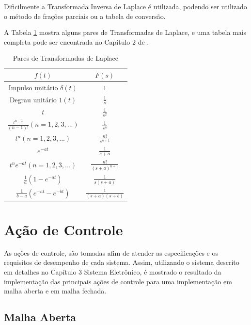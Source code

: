 Dificilmente a Transformada Inversa de Laplace é utilizada, podendo ser utilizado o método de frações parciais ou a tabela de conversão.

A Tabela \ref{tab:Laplace} mostra alguns pares de Transformadas de Laplace, e uma tabela mais completa pode ser encontrada no Capítulo 2 de \cite{Ogata}. 

\begin{table}[h]
\centering
\caption{Pares de Transformadas de Laplace}
\label{tab:Laplace}
\begin{tabular}{c|c}
\hline
$f(t)$ & $F(s)$ \\
\hline
\hline
Impulso unitário $\delta(t)$ 		& $1$ 			\\ \hline
Degrau unitário $1(t)$ 			& $\frac{1}{s}$		\\ \hline
$t$ 					& $\frac{1}{s^2}$ 	\\ \hline
$\frac{t^{n-1}}{(n-1)!} (n=1,2,3,...)$ 	& $\frac{1}{s^n}$ 	\\ \hline
$t^n (n=1,2,3,...)$ 			& $\frac{n!}{s^{n+1}}$ 	\\ \hline
$e^{-at}$ 				& $\frac{1}{s+a}$ 	\\ \hline
$t^n e^{-at} (n=1,2,3,...)$ 		& $\frac{n!}{(s+a)^{n+1}}$ \\\hline
$\frac{1}{a} (1-e^{-at})$ 		& $\frac{1}{s(s+a)}$ 	\\ \hline
$\frac{1}{b-a}(e^{-at}-e^{-bt})$ 	& $\frac{1}{(s+a)(s+b)}$ \\ \hline
\end{tabular}
\end{table}






\section{Ação de Controle}

As ações de controle, são tomadas afim de atender as especificações e os requisitos de desempenho de cada sistema. Assim, utilizando o sistema descrito em detalhes no Capítulo 3 Sistema Eletrônico, é mostrado o resultado da implementação das principais ações de controle para uma implementação em malha aberta e em malha fechada.

\subsection{ Malha Aberta }

